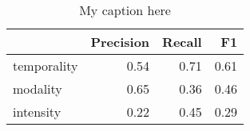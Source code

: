 \begin{table}[!ht]
\centering
\begin{tabular}{lrrr}
\toprule
{} &  Precision &  Recall &   F1 \\
\midrule
temporality &       0.54 &    0.71 & 0.61 \\
modality    &       0.65 &    0.36 & 0.46 \\
intensity   &       0.22 &    0.45 & 0.29 \\
\bottomrule
\end{tabular}
\caption{My caption here}
\label{tab:MOOD_ASSESMENT-ocd-combined-F1}
\end{table}